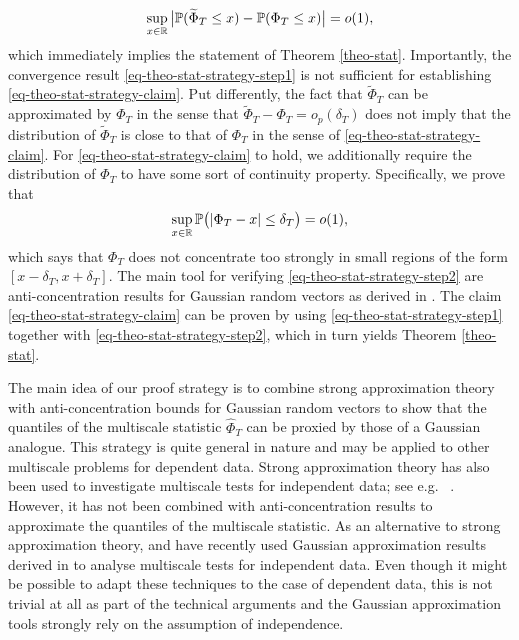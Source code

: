 \begin{equation}\label{eq-theo-stat-strategy-claim}
\sup_{x \in \mathbb{R}} \big| \mathbb{P}(\widetilde{\Phi}_T \le x) - \mathbb{P}(\Phi_T \le x) \big| = o(1), 
\end{equation}
which immediately implies the statement of Theorem \ref{theo-stat}. Importantly, the convergence result \eqref{eq-theo-stat-strategy-step1} is not sufficient for establishing \eqref{eq-theo-stat-strategy-claim}. Put differently, the fact that $\widetilde{\Phi}_T$ can be approximated by $\Phi_T$ in the sense that $\widetilde{\Phi}_T - \Phi_T = o_p(\delta_T)$ does not imply that the distribution of $\widetilde{\Phi}_T$ is close to that of $\Phi_T$ in the sense of \eqref{eq-theo-stat-strategy-claim}. For \eqref{eq-theo-stat-strategy-claim} to hold, we additionally require the distribution of $\Phi_T$ to have some sort of continuity property. Specifically, we prove that 
\begin{equation}\label{eq-theo-stat-strategy-step2}
\sup_{x \in \mathbb{R}} \mathbb{P} \big( |\Phi_T - x| \le \delta_T \big) = o(1),
\end{equation}
which says that $\Phi_T$ does not concentrate too strongly in small regions of the form $[x-\delta_T,x+\delta_T]$. The main tool for verifying \eqref{eq-theo-stat-strategy-step2} are anti-concentration results for Gaussian random vectors as derived in \cite{Chernozhukov2015}. The claim \eqref{eq-theo-stat-strategy-claim} can be proven by using \eqref{eq-theo-stat-strategy-step1} together with \eqref{eq-theo-stat-strategy-step2}, which in turn yields Theorem \ref{theo-stat}. 


The main idea of our proof strategy is to combine strong approximation theory with anti-concentration bounds for Gaussian random vectors to show that the quantiles of the multiscale statistic $\widehat{\Phi}_T$ can be proxied by those of a Gaussian analogue. This strategy is quite general in nature and may be applied to other multiscale problems for dependent data. Strong approximation theory has also been used to investigate multiscale tests for independent data; see e.g.\ 
\cite{SchmidtHieber2013}. However, it has not been combined with anti-concentration results to approximate the quantiles of the multiscale statistic. As an alternative to strong approximation theory, \cite{EckleBissantzDette2017} and \cite{ProkschWernerMunk2018} have recently used Gaussian approximation results derived in \cite{Chernozhukov2014, Chernozhukov2017} to analyse multiscale tests for independent data. Even though it might be possible to adapt these techniques to the case of dependent data, this is not trivial at all as part of the technical arguments and the Gaussian approximation tools strongly rely on the assumption of independence. 


